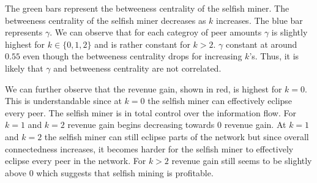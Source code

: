 The green bars represent the betweeness centrality of the selfish miner. The betweeness centrality of the selfish miner decreases as $k$ increases. The blue bar represents $\gamma$. We can observe that for each categroy of peer amounts $\gamma$ is slightly highest for $k \in \{0,1,2\}$ and is rather constant for $k>2$. $\gamma$  constant at around $0.55$ even though the betweeness centrality drops for increasing $k$'s. Thus, it is likely that $\gamma$ and  betweeness centrality are not correlated.

We can further observe that the revenue gain, shown in red, is highest for $k=0$. This is understandable since at $k=0$ the selfish miner can effectively eclipse every peer. The selfish miner is in total control over the information flow. For $k=1$ and $k=2$ revenue gain begins decreasing towards $0$ revenue gain. At $k=1$ and $k=2$ the selfish miner can still eclipse parts of the network but since overall connectedness increases, it becomes harder for the selfish miner to effectively eclipse every peer in the network. For $k>2$ revenue gain still seems to be slightly above $0$ which suggests that selfish mining is profitable.






















